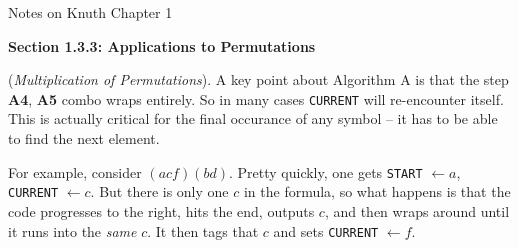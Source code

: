 \topglue 0.5in
\centerline{Notes on Knuth Chapter 1}
\vskip 0.5in

\noindent\centerline{{\bf Section 1.3.3: Applications to Permutations}}
\vskip 0.2in
 ({\it Multiplication of Permutations}).
A key point about Algorithm A is that the step {\bf A4},
{\bf A5} combo wraps entirely.  So in many cases {\tt CURRENT} will
re-encounter itself.  This is actually critical for the final occurance of
any symbol -- it has to be able to find the next element.  

For example,
consider $\left(a c f\right)\left(b d\right)$.  Pretty quickly, one gets
{\tt START} $\gets a$, {\tt CURRENT} $\gets c$.  But there is only one $c$
in the formula, so what happens is that the code progresses to the right,
hits the end, outputs $c$, and then wraps around until it runs into the 
{\it same} $c$.  It then tags that $c$ and sets {\tt CURRENT} $\gets f$.

